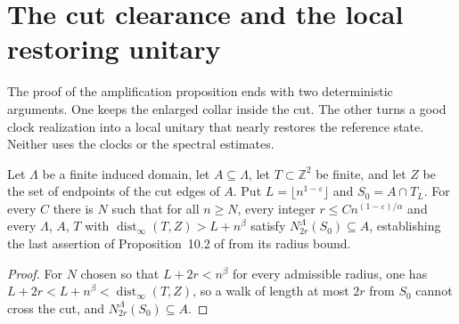 
\section{The cut clearance and the local restoring unitary}

The proof of the amplification proposition ends with two deterministic
arguments. One keeps the enlarged collar inside the cut. The other turns a
good clock realization into a local unitary that nearly restores the
reference state. Neither uses the clocks or the spectral estimates.

\begin{lemma}
    \label{thm:area_law_amplification_cut_clearance}
    \leanok
    Let $\Lambda$ be a finite induced domain, let $A\subseteq\Lambda$, let
    $T\subset\mathbb Z^2$ be finite, and let $Z$ be the set of endpoints of the
    cut edges of $A$. Put $L=\lfloor n^{1-\varepsilon}\rfloor$ and
    $S_0=A\cap T_L$. For every $C$ there is $N$ such that for all $n\ge N$,
    every integer $r\le Cn^{(1-\varepsilon)/\alpha}$ and every $\Lambda$, $A$,
    $T$ with $\operatorname{dist}_\infty(T,Z)>L+n^\beta$ satisfy
    $N_{2r}^\Lambda(S_0)\subseteq A$, establishing the last assertion of
    Proposition~10.2 of \cite{OpenAI2026AreaLaw} from its radius bound.
\end{lemma}
\begin{proof}
    \leanok
    For $N$ chosen so that $L+2r<n^\beta$ for every admissible radius, one has
    $L+2r<L+n^\beta<\operatorname{dist}_\infty(T,Z)$, so a walk of length at
    most $2r$ from $S_0$ cannot cross the cut, and
    $N_{2r}^\Lambda(S_0)\subseteq A$.
\end{proof}

